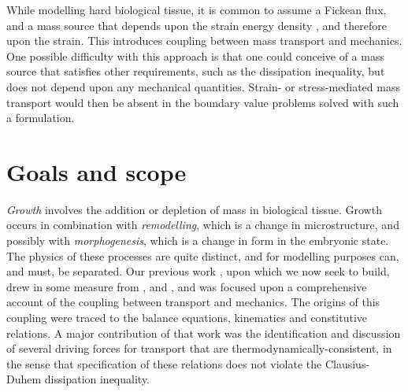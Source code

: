 While modelling hard biological tissue, it is common to assume a
Fickean flux, and a mass source that depends upon the strain
energy density \citep{HarriganHamilton:1993}, and therefore upon
the strain. This introduces coupling between mass transport and
mechanics. One possible difficulty with this approach is that one
could conceive of a mass source that satisfies other requirements,
such as the dissipation inequality, but does not depend upon any
mechanical quantities. Strain- or stress-mediated mass transport
would then be absent in the boundary value problems solved with
such a formulation.

\section{Goals and scope}
\label{goals}

\emph{Growth} involves the addition or depletion of mass in biological
tissue. Growth occurs in combination with
\emph{remodelling}, which is a change in microstructure, and possibly
with \emph{morphogenesis}, which is a change in form in the embryonic
state. The physics of these processes are quite distinct, and for
modelling purposes can, and must, be separated. Our previous work
\citep{growthpaper}, upon which we now seek to build, drew in some
measure from \citet{CowinHegedus:76, EpsteinMaugin:2000}, and
\citet{TaberHumphrey:2001}, and was focused upon a comprehensive
account of the coupling between transport and mechanics. The origins
of this coupling were traced to the balance equations, kinematics and
constitutive relations. A major contribution of that work was the
identification and discussion of several driving forces for transport
that are thermodynamically-consistent, in the sense that specification
of these relations does not violate the Clausius-Duhem dissipation
inequality. 

